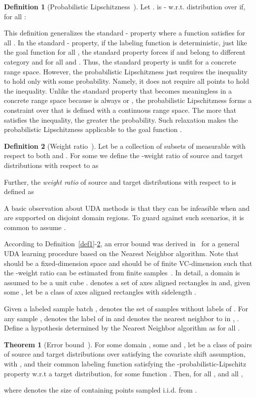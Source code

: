 \documentclass[journal,twocolumn]{IEEEtran}
\theoremstyle{definition}
\newtheorem{definition}{Definition}
\newtheorem{theorem}{Theorem}
\begin{document}
\begin{definition}[Probabilistic Lipschitzness~\cite{Ben-David2014}]
Let .  is - w.r.t. distribution  over  if, for all :

\label{def2}
\end{definition}
This definition generalizes the standard - property where a function  satisfies  for all . In the standard - property, if the labeling function is deterministic, just like the goal function  for all , the standard property forces  if  and  belong to different category and  for all  and . Thus, the standard property is unfit for a concrete range space. However, the probabilistic Lipschitzness just requires the inequality  to hold only with some probability. Namely,  it does not require all points to hold the inequality. Unlike the standard property that becomes meaningless in a concrete range space because  is always  or , the probabilistic Lipschitzness forms a constraint over  that is defined with a continuous range space. The more  that satisfies the inequality, the greater the probability. Such relaxation makes  the probabilistic Lipschitzness applicable to the goal function .

\begin{definition}[Weight ratio~\cite{Ben-David2014}]
Let  be a collection of subsets of  measurable with respect to both  and . For some  we define the -weight ratio of source and target distributions with respect to  as

Further, the \textit{weight ratio} of source and target distributions with respect to  is defined as

\label{def3}
\end{definition}
A basic observation about UDA  methods is that they can be infeasible when  and  are supported on disjoint domain regions. To guard against such scenarios, it is common to assume .

According to Definition~\ref{def1}-\ref{def3}, an error bound was derived in~\cite{Ben-David2014} for a general UDA learning procedure based on the Nearest Neighbor algorithm. Note that  should be a fixed-dimension space and  should be of finite VC-dimension such that the -weight ratio can be estimated from finite samples~\cite{Ben-David2014}. In detail, a domain is assumed to be a unit cube .  denotes a set of axes aligned rectangles in  and, given some , let  be a class of axes aligned rectangles with sidelength .

Given a labeled sample batch ,   denotes the set of samples without labels of . For any sample ,  denotes the label of  in  and  denotes the nearest neighbor to  in , . Define a hypothesis determined by the Nearest Neighbor algorithm as  for all .
\begin{theorem}[Error bound~\cite{Ben-David2014}]\label{the1}
For some domain , some  and , let  be a class of pairs  of source and target distributions over  satisfying the covariate shift assumption, with , and their common labeling function  satisfying the -probabilistic-Lipschitz property w.r.t a target distribution, for some function . Then, for all , and all ,
 
where  denotes the size of  containing points sampled i.i.d. from .
\end{theorem}
\end{document}
